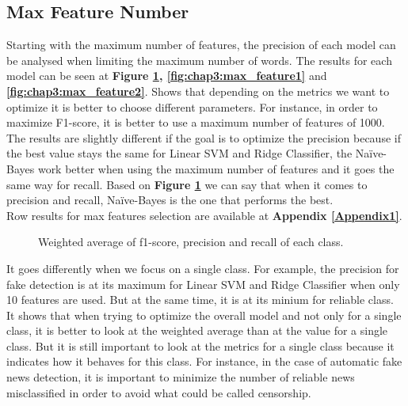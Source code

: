 \subsection{Max Feature Number}
Starting with the maximum number of features, the precision of each model can be analysed when limiting the maximum number of words. The results for each model can be seen at \textbf{Figure \ref{fig:chap3:max_feature3}, \ref{fig:chap3:max_feature1}} and \textbf{\ref{fig:chap3:max_feature2}}. Shows that depending on the metrics we want to optimize it is better to choose different parameters. For instance, in order to maximize F1-score, it is better to use a maximum number of features of 1000.\\
The results are slightly different if the goal is to optimize the precision because if the best value stays the same for Linear SVM and Ridge Classifier, the Na\"{i}ve-Bayes work better when using the maximum number of features and it goes the same way for recall. 
Based on \textbf{Figure \ref{fig:chap3:max_feature3}} we can say that when it comes to precision and recall, Na\"{i}ve-Bayes is the one that performs the best.\\
Row results for max features selection are available at \textbf{Appendix \ref{Appendix1}}.
\begin{figure}[]
 \centering
 \caption{Weighted average of f1-score, precision and recall of each class. }
 \label{fig:chap3:max_feature3}
\end{figure}
It goes differently when we focus on a single class. For example, the precision for fake detection is at its maximum for Linear SVM and Ridge Classifier when only 10 features are used. But at the same time, it is at its minium for reliable class. It shows that when trying to optimize the overall model and not only for a single class, it is better to look at the weighted average than at the value for a single class. But it is still important to look at the metrics for a single class because it indicates how it behaves for this class. For instance, in the case of automatic fake news detection, it is important to minimize the number of reliable news misclassified in order to avoid what could be called censorship. 
